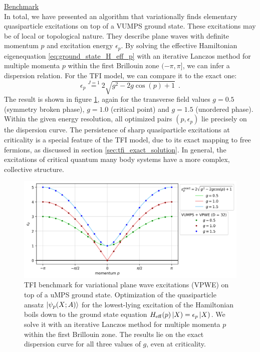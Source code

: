 \noindent \underline{Benchmark} \\[0.5em]
\noindent In total, we have presented an algorithm that variationally finds elementary quasiparticle excitations on top of a VUMPS ground state. These excitations may be of local or topological nature. They describe plane waves with definite momentum $p$ and excitation energy $\epsilon_p$. By solving the effective Hamiltonian eigenequation \eqref{eq:ground_state_H_eff_p} with an iterative Lanczos method for multiple momenta $p$ within the first Brillouin zone $(- \pi, \pi ]$, we can infer a dispersion relation. For the TFI model, we can compare it to the exact one:
\begin{equation}
	\epsilon_p \overset{J = 1}{=} 2\sqrt{g^2 - 2 g \cos(p) + 1} \:\:.
\end{equation}
The result is shown in figure \ref{fig:uexcitations_dispersion}, again for the transverse field values $g = 0.5$ (symmetry broken phase), $g = 1.0$ (critical point) and $g = 1.5$ (unordered phase). Within the given energy resolution, all optimized pairs $(p, \epsilon_p)$ lie precisely on the dispersion curve. The persistence of sharp quasiparticle excitations at criticality is a special feature of the TFI model, due to its exact mapping to free fermions, as discussed in section \ref{sec:tfi_exact_solution}. In general, the excitations of critical quantum many body systems have a more complex, collective structure.
\begin{figure}[t]
  \centering
  \includegraphics[width=1.0\linewidth]{uexcitations_dispersion.png}
  \caption{TFI benchmark for variational plane wave excitations (VPWE) on top of a uMPS ground state. Optimization of the quasiparticle ansatz $\ket{\psi_p(X; A)}$ for the lowest-lying excitation of the Hamiltonian boils down to the ground state equation $H_{\mathrm{eff}}(p) \left| X \right) = \epsilon_p \left| X \right)$. We solve it with an iterative Lanczos method for multiple momenta $p$ within the first Brillouin zone. The results lie on the exact dispersion curve for all three values of $g$, even at criticality.}
\label{fig:uexcitations_dispersion}
\end{figure}